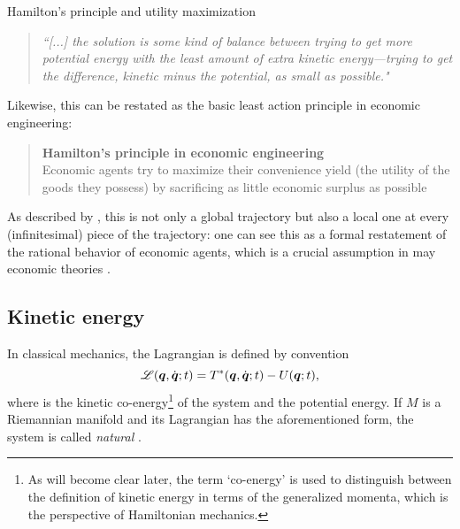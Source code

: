 \begin{econ}{Hamilton's principle and utility maximization}
    \begin{quote}
        \emph{``[...] the solution is some kind of balance between trying to get more potential energy with the least amount of extra kinetic energy—trying to get the difference, kinetic minus the potential, as small as possible."}
    \end{quote}
    Likewise, this can be restated as the basic least action principle in economic engineering:
    \begin{quote}
        \textbf{Hamilton's principle in economic engineering}\\ Economic agents try  to maximize their convenience yield (the utility of the goods they possess) by sacrificing as little  economic surplus as possible
    \end{quote}
    As described by \citet{Feynman2010}, this is not only a global trajectory but also a local one at every (infinitesimal) piece of the trajectory: one can see this as a formal restatement of the rational behavior of economic agents, which is a crucial assumption in may economic theories \cite{Mankiw2017}.
\end{econ}

\subsection{Kinetic energy}
In classical mechanics, the Lagrangian is defined by convention
\[\mathscr{L}(\vb*{q},\dot{\vb*{q}}; t) = T^*(\vb*{q},\dot{\vb*{q}}; t) - U(\vb*{q}; t),\] 
where \ecokin is the kinetic co-energy\footnote{As will become clear later, the term `co-energy' is used to distinguish between the definition of kinetic energy in terms of the generalized momenta, which is the perspective of Hamiltonian mechanics.} of the system and \epot the potential energy. If \(M\) is a Riemannian manifold and its Lagrangian has the aforementioned form, the system is called \emph{natural} \cite{Arnold1989}.

